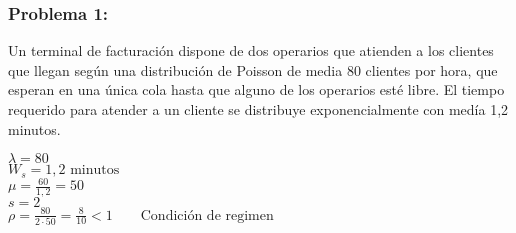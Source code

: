 \documentclass{templateNote}
\begin{document}
\subsubsection{Problema 1:}
Un terminal de facturaci\'on dispone de dos operarios que atienden a los clientes que llegan seg\'un una distribuci\'on de Poisson de media 80 clientes por hora, que esperan en una \'unica cola hasta que alguno de los operarios est\'e libre. El tiempo requerido para atender a un cliente se distribuye exponencialmente con med\'ia 1,2 minutos.
\begin{tcolorbox}[
    colframe=Celeste!100, %
    colback=Celeste!20,       %
    coltitle=white!100, %
    title=\textbf{Datos}, %
]
    $\lambda = 80$ \\
    $W_s = 1,2 \text{ minutos}$ \\
    $\mu = \frac{60}{1,2} = 50$ \\
    $s = 2$ \\
    $\rho = \frac{80}{2 \cdot 50} = \frac{8}{10} < 1 \qquad \text{Condici\'on de regimen}$
\end{tcolorbox}
\end{document}
